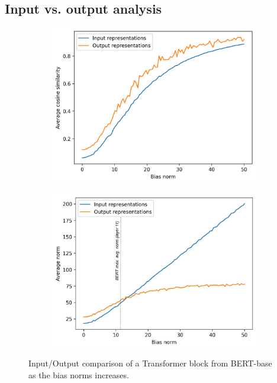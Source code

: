 \subsection{Input vs. output analysis}
\begin{figure}[ht]
    \centering
    \begin{subfigure}[b]{0.43\columnwidth}
         \includegraphics[width=\linewidth]{sources/part_1/anisotropy/imgs/scratch_bert_base_input_vs_output.png}
         \label{fig:cos_scratch_transformer}
    \end{subfigure}
    \hfill
    \begin{subfigure}[b]{0.43\columnwidth}
         \includegraphics[width=\linewidth]{sources/part_1/anisotropy/imgs/bert_base_norm_v_output.pdf}
         \label{fig:norm_scratch_transformer}
    \end{subfigure}
    \caption{Input/Output comparison of a Transformer block from BERT-base as the bias norms increases.}
    \label{fig:bias_vs_cosine_norm}
\end{figure}

